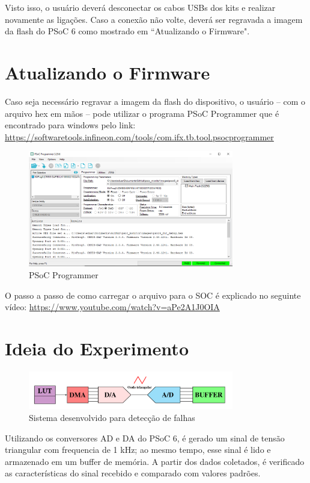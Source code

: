 \documentclass[12pt, a4paper]{article}
\begin{document}
Visto isso, o usuário deverá desconectar os cabos USBs dos kits e realizar novamente as ligações. Caso a conexão não volte, deverá ser regravada a imagem da flash do PSoC 6 como mostrado em ``Atualizando o Firmware".

\section{Atualizando o Firmware}

Caso seja necessário regravar a imagem da flash do dispositivo, o usuário -- com o arquivo hex em mãos -- pode utilizar o programa PSoC Programmer que é encontrado para windows pelo link: \url{https://softwaretools.infineon.com/tools/com.ifx.tb.tool.psocprogrammer}

\begin{figure}[H]
    \centering
    \caption{PSoC Programmer}
    \includegraphics[width=0.8\textwidth]{../imgs/psoc_programmer.png}

    \vspace{0.5em}
    \label{fig:psoc_programmer}
\end{figure}

O passo a passo de como carregar o arquivo para o SOC é explicado no seguinte vídeo: \url{https://www.youtube.com/watch?v=aPe2A1J0OIA}

\section{Ideia do Experimento}

\begin{figure}[H]
    \centering
    \caption{Sistema desenvolvido para detecção de falhas}
    \includegraphics[width=0.8\textwidth]{../imgs/ideia_experimento.png}

    \vspace{0.5em}
    \label{fig:experiment_idea}
\end{figure}

Utilizando os conversores AD e DA do PSoC 6, é gerado um sinal de tensão triangular com frequencia de 1 kHz; ao mesmo tempo, esse sinal é lido e armazenado em um buffer de memória. A partir dos dados coletados, é verificado as características do sinal recebido e comparado com valores padrões.
\end{document}

